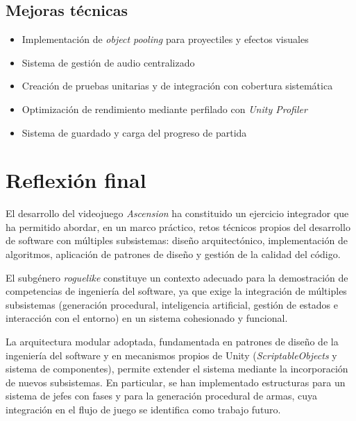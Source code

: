 \subsection{Mejoras técnicas}


\begin{itemize}
\item Implementación de \textit{object pooling} para proyectiles y efectos visuales
\item Sistema de gestión de audio centralizado
\item Creación de pruebas unitarias y de integración con cobertura sistemática
\item Optimización de rendimiento mediante perfilado con \textit{Unity Profiler}
\item Sistema de guardado y carga del progreso de partida
\end{itemize}

\section{Reflexión final}


El desarrollo del videojuego \textit{Ascension} ha constituido un ejercicio integrador que ha permitido abordar, en un marco práctico, retos técnicos propios del desarrollo de software con múltiples subsistemas: diseño arquitectónico, implementación de algoritmos, aplicación de patrones de diseño y gestión de la calidad del código.

El subgénero \textit{roguelike} constituye un contexto adecuado para la demostración de competencias de ingeniería del software, ya que exige la integración de múltiples subsistemas (generación procedural, inteligencia artificial, gestión de estados e interacción con el entorno) en un sistema cohesionado y funcional.

La arquitectura modular adoptada, fundamentada en patrones de diseño de la ingeniería del software y en mecanismos propios de Unity (\textit{ScriptableObjects} y sistema de componentes), permite extender el sistema mediante la incorporación de nuevos subsistemas. En particular, se han implementado estructuras para un sistema de jefes con fases y para la generación procedural de armas, cuya integración en el flujo de juego se identifica como trabajo futuro.







